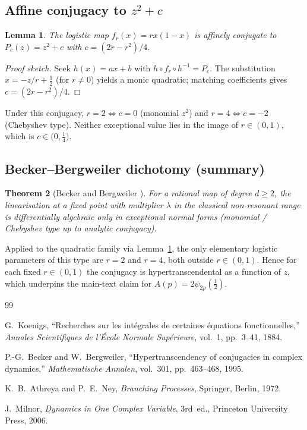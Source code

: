 \documentclass[11pt,a4paper]{article}
\theoremstyle{plain}
\newtheorem{theorem}{Theorem}[section]
\newtheorem{lemma}[theorem]{Lemma}
\theoremstyle{definition}
\begin{document}
\subsection{Affine conjugacy to $z^2+c$}

\begin{lemma}
\label{lem:affine}
The logistic map $f_r(x)=rx(1-x)$ is affinely conjugate to $P_c(z)=z^2+c$ with $c=(2r-r^2)/4$.
\end{lemma}

\begin{proof}[Proof sketch]
Seek $h(x)=ax+b$ with $h\circ f_r\circ h^{-1}=P_c$. The substitution $x=-z/r+\tfrac12$ (for $r\neq0$) yields a monic quadratic; matching coefficients gives $c=(2r-r^2)/4$.
\end{proof}

Under this conjugacy, $r=2\Leftrightarrow c=0$ (monomial $z^2$) and $r=4\Leftrightarrow c=-2$ (Chebyshev type). Neither exceptional value lies in the image of $r\in(0,1)$, which is $c\in\bigl(0,\tfrac14\bigr)$.

\subsection{Becker--Bergweiler dichotomy (summary)}

\begin{theorem}[Becker and Bergweiler \cite{Becker1995}]
\label{thm:BB}
For a rational map of degree $d\ge 2$, the linearisation at a fixed point with multiplier $\lambda$ in the classical non-resonant range is differentially algebraic only in exceptional normal forms (monomial / Chebyshev type up to analytic conjugacy).
\end{theorem}

Applied to the quadratic family via Lemma~\ref{lem:affine}, the only elementary logistic parameters of this type are $r=2$ and $r=4$, both outside $r\in(0,1)$. Hence for each fixed $r\in(0,1)$ the conjugacy is hypertranscendental as a function of $z$, which underpins the main-text claim for $A(p)=2\psi_{2p}(\tfrac12)$.

\begin{thebibliography}{99}

G.~Koenigs,
``Recherches sur les int{\'e}grales de certaines {\'e}quations fonctionnelles,''
\textit{Annales Scientifiques de l'{\'E}cole Normale Sup{\'e}rieure},
vol.~1, pp.~3--41, 1884.

P.-G.~Becker and W.~Bergweiler,
``Hypertranscendency of conjugacies in complex dynamics,''
\textit{Mathematische Annalen},
vol.~301, pp.~463--468, 1995.

K.~B.~Athreya and P.~E.~Ney,
\textit{Branching Processes},
Springer, Berlin, 1972.

J.~Milnor,
\textit{Dynamics in One Complex Variable},
3rd~ed., Princeton University Press, 2006.

\end{thebibliography}
\end{document}
